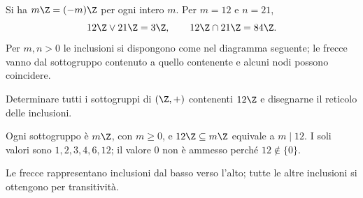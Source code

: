 \begin{esempio}
Si ha $m\Z=(-m)\Z$ per ogni intero $m$. Per $m=12$ e $n=21$,
\[
12\Z\vee21\Z=3\Z,\qquad12\Z\cap21\Z=84\Z.
\]
Per $m,n>0$ le inclusioni si dispongono come nel diagramma seguente; le frecce vanno dal sottogruppo contenuto a quello contenente e alcuni nodi possono coincidere.
\begin{center}
\end{center}
\end{esempio}

\begin{esercizio}
Determinare tutti i sottogruppi di $(\Z,+)$ contenenti $12\Z$ e disegnarne il reticolo delle inclusioni.
\end{esercizio}
\begin{svolgimento}
Ogni sottogruppo è $m\Z$, con $m\ge0$, e $12\Z\subseteq m\Z$ equivale a $m\mid12$. I soli valori sono $1,2,3,4,6,12$; il valore $0$ non è ammesso perché $12\notin\{0\}$.
\begin{center}
\end{center}
Le frecce rappresentano inclusioni dal basso verso l'alto; tutte le altre inclusioni si ottengono per transitività.
\end{svolgimento}

